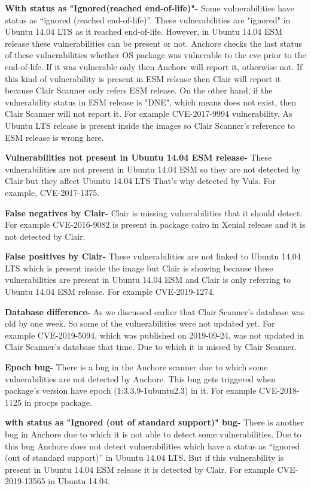 \documentclass[a4paper,num-refs]{oup-contemporary}
\begin{document}
\textbf{With status as "Ignored(reached end-of-life)"-} Some vulnerabilities have status as “ignored (reached end-of-life)”.
These vulnerabilities are "ignored" in Ubuntu 14.04 LTS as it reached end-of-life. 
However, in Ubuntu 14.04 ESM release these vulnerabilities can be present or not.
Anchore checks the last status of these vulnerabilities whether OS package was vulnerable to the cve
prior to the end-of-life. If it was vulnerable only then Anchore will report it, otherwise not.
If this kind of vulnerability is present in ESM release then Clair will report it because Clair Scanner
only refers ESM release. On the other hand, if the vulnerability
status in ESM release is "DNE", which means does not exist, then Clair Scanner will not report it. 
For example CVE-2017-9994 vulnerability. As Ubuntu LTS release is present inside the images so
Clair Scanner's reference to ESM release is wrong here.

\textbf{Vulnerabilities not present in Ubuntu 14.04 ESM release-} These vulnerabilities are not present in Ubuntu 14.04 ESM so they 
are not detected by Clair but they affect Ubuntu 14.04 LTS That’s why detected by Vuls. For example, CVE-2017-1375.

\textbf{False negatives by Clair-} Clair is missing vulnerabilities that it should detect. For example CVE-2016-9082 
is present in package cairo in Xenial release and it is not detected by Clair.

\textbf{False positives by Clair-} These vulnerabilities are not linked to Ubuntu 14.04 LTS which is 
present inside the image but Clair is showing because these vulnerabilities are present in Ubuntu 14.04 ESM and 
Clair is only referring to Ubuntu 14.04 ESM release. For example CVE-2019-1274.

\textbf{Database difference-} As we discussed earlier that Clair Scanner's database was old by one week.
                So some of the vulnerabilities were not updated yet. For example CVE-2019-5094, which
		was published on 2019-09-24, was not 
		updated in Clair Scanner's database that time. Due to which it is missed by Clair Scanner.

\textbf{Epoch bug-} There is a bug in the Anchore scanner due to which some vulnerabilities are 
		not detected by Anchore. This bug gets triggered when package’s version have epoch 
		(1:3.3.9-1ubuntu2.3)  in it. For example CVE-2018-1125 in procps package.

\textbf{with status as "Ignored (out of standard support)" bug-} There is another bug in Anchore due to 
		which it is not able to detect some vulnerabilities. Due to this bug Anchore does not detect 
		vulnerabilities which have a status as “ignored (out of standard support)” in Ubuntu 14.04 LTS. 
		But if this vulnerability is present in Ubuntu 14.04 ESM release it is detected by Clair. 
		For example CVE-2019-13565 in Ubuntu 14.04.
\end{document}
